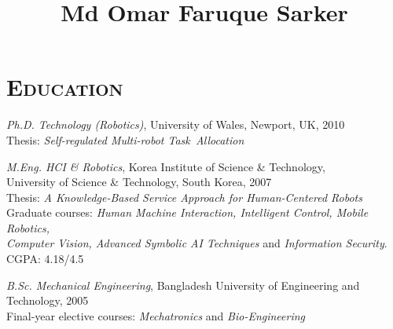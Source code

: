 \documentclass[notopicbreak,contbibnum,plain]{simplecv}
\begin{document}


%
\title{\Large Md Omar Faruque Sarker}
%
\maketitle
\vspace*{-1cm}
\section{\textsc{Education}}
\label{edu}
\begin{topic}
    \item \emph{Ph.D. Technology (Robotics)}, 
    University of Wales, Newport, UK, 2010\\
    Thesis: \textit{Self-regulated Multi-robot 				Task~Allocation}
\vspace*{-0.1cm}
    \item \emph{M.Eng. HCI \& Robotics},  
    Korea Institute of Science \& Technology,\\ University of Science \& Technology, South Korea, 2007\\ 
        Thesis: \textit{A Knowledge-Based Service Approach
for Human-Centered Robots}\\
Graduate courses: \emph{Human Machine Interaction, Intelligent Control, Mobile Robotics,\\ Computer Vision, Advanced Symbolic AI
Techniques} and \emph{Information Security}. CGPA: 4.18/4.5
\vspace*{-0.1cm}
    \item \emph{B.Sc. Mechanical Engineering},
    Bangladesh University of Engineering and Technology, 2005\\       
Final-year elective courses: \emph{Mechatronics} and \emph{Bio-Engineering}
\end{topic}
\end{document}
